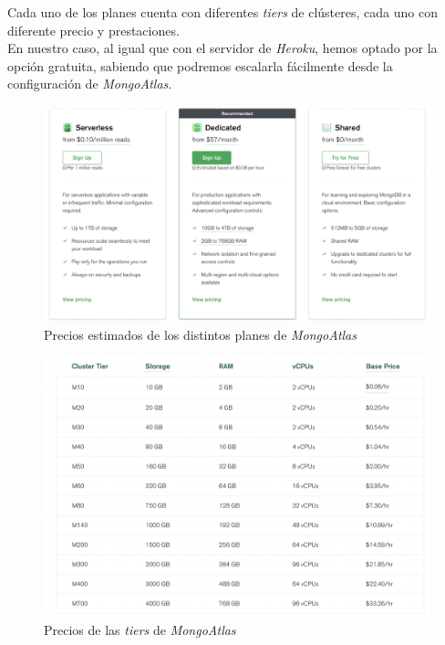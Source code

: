 Cada uno de los planes cuenta con diferentes \textit{tiers} de clústeres, cada uno con diferente precio y
prestaciones.\\

En nuestro caso, al igual que con el servidor de \textit{Heroku}, hemos optado por la opción gratuita, sabiendo que
podremos escalarla fácilmente desde la configuración de \textit{MongoAtlas}.\\

\begin{figure}[H]
    \centering	
        \includegraphics[scale=0.25]{img/mongo-plans.png}
    \caption{ Precios estimados de los distintos planes de \textit{MongoAtlas} }\label{fig:mongo-plans}
\end{figure}

\begin{figure}[H]
    \centering	
        \includegraphics[scale=0.25]{img/mongo-tiers.png}
    \caption{ Precios de las \textit{tiers} de \textit{MongoAtlas} }\label{fig:mongo-tiers}
\end{figure}
